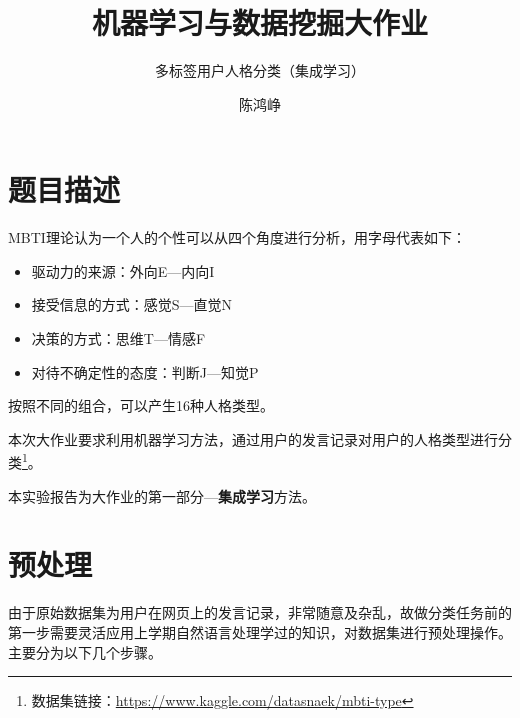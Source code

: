 \documentclass[logo,reportComp]{thesis}
\title{机器学习与数据挖掘大作业}
\subtitle{多标签用户人格分类（集成学习）}
\author{陈鸿峥}
\begin{document}
\maketitle
\tableofcontents

\newpage
\section{题目描述}
MBTI理论认为一个人的个性可以从四个角度进行分析，用字母代表如下：
\begin{itemize}
    \item 驱动力的来源：外向E---内向I
    \item 接受信息的方式：感觉S---直觉N
    \item 决策的方式：思维T---情感F
    \item 对待不确定性的态度：判断J---知觉P
\end{itemize}
按照不同的组合，可以产生16种人格类型。

本次大作业要求利用机器学习方法，通过用户的发言记录对用户的人格类型进行分类\footnote{数据集链接：\url{https://www.kaggle.com/datasnaek/mbti-type}}。

本实验报告为大作业的第一部分---\textbf{集成学习}方法。

\section{预处理}
由于原始数据集为用户在网页上的发言记录，非常随意及杂乱，故做分类任务前的第一步需要灵活应用上学期自然语言处理学过的知识，对数据集进行预处理操作。
主要分为以下几个步骤。
\end{document}
